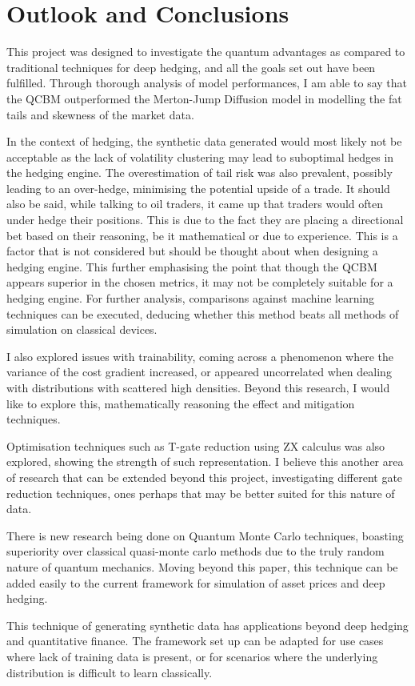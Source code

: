 \documentclass[12pt]{article}
\newcommand{\newp}
    {
    \vskip 0.5cm 
  }
\numberwithin{equation}{section}
\begin{document}
\section{Outlook and Conclusions}
This project was designed to investigate the quantum advantages as compared to 
traditional techniques for deep hedging, and all the goals set out have been 
fulfilled. Through thorough analysis of model performances, I am able to say that 
the QCBM outperformed the Merton-Jump Diffusion model in modelling the fat tails 
and skewness of the market data. 
\newp
In the context of hedging, the synthetic data generated would most likely not be 
acceptable as the lack of volatility clustering may lead to suboptimal hedges 
in the hedging engine. The overestimation of tail risk was also prevalent, possibly 
leading to an over-hedge, minimising the potential upside of a trade. It should 
also be said, while talking to oil traders, it came up that traders would often 
under hedge their positions. This is due to the fact they are placing a directional 
bet based on their reasoning, be it mathematical or due to experience. 
This is a factor that is not considered but should be thought about when designing
a hedging engine. This further emphasising the point that though the QCBM appears 
superior in the chosen metrics, it may not be completely suitable for a hedging 
engine. For further analysis, comparisons against machine learning techniques
can be executed, deducing whether this method beats all methods of simulation on 
classical devices. 
\newp 
I also explored issues with trainability, coming across a phenomenon where the 
variance of the cost gradient increased, or appeared uncorrelated when dealing 
with distributions with scattered high densities. Beyond this research, I would like 
to explore this, mathematically reasoning the effect and mitigation techniques. 
\newp 
Optimisation techniques such as T-gate reduction using ZX calculus was also 
explored, showing the strength of such representation. I believe this another 
area of research that can be extended beyond this project, investigating 
different gate reduction techniques, ones perhaps that may be better suited for 
this nature of data. 
\newp
There is new research being done on Quantum Monte Carlo techniques, boasting
superiority over classical quasi-monte carlo methods due to the truly random 
nature of quantum mechanics. Moving beyond this paper, this technique can be 
added easily to the current framework for simulation of asset prices and 
deep hedging. 
\newp
This technique of generating synthetic data has applications beyond deep hedging 
and quantitative finance. The framework set up can be adapted for use cases where 
lack of training data is present, or for scenarios where the underlying distribution 
is difficult to learn classically. 
\end{document}
